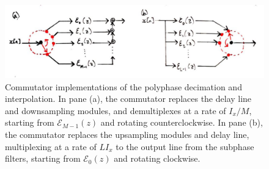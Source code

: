 \begin{figure}[H]
  \includegraphics[width=\textwidth]{images/lecture_15_commutator.JPG}
  \caption{Commutator implementations of the polyphase decimation and interpolation.
    In pane (a), the commutator replaces the delay line and downsampling modules,
    and demultiplexes at a rate of $I_x/M$, starting from $\mathscr{E}_{M-1}(z)$ and
    rotating counterclockwise. In pane (b), the commutator replaces the upsampling
    modules and delay line, multiplexing at a rate of $LI_x$ to the output line
    from the subphase filters, starting from $\mathscr{E}_0(z)$ and rotating
    clockwise.
  }
  \label{fig::lecture_15_commutator}
\end{figure}
